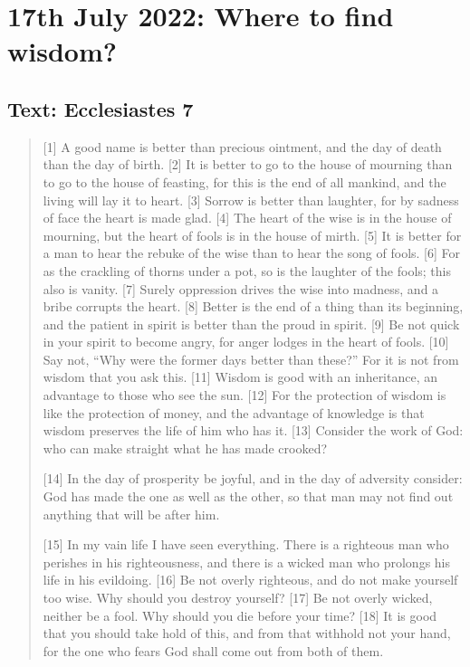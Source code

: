\section{17th July 2022: Where to find wisdom?}
\subsection*{Text: Ecclesiastes 7}
  \begin{quote}
    [1] A good name is better than precious ointment,
        and the day of death than the day of birth.
    [2] It is better to go to the house of mourning
        than to go to the house of feasting,
    for this is the end of all mankind,
        and the living will lay it to heart.
    [3] Sorrow is better than laughter,
        for by sadness of face the heart is made glad.
    [4] The heart of the wise is in the house of mourning,
        but the heart of fools is in the house of mirth.
    [5] It is better for a man to hear the rebuke of the wise
        than to hear the song of fools.
    [6] For as the crackling of thorns under a pot,
        so is the laughter of the fools;
        this also is vanity.
    [7] Surely oppression drives the wise into madness,
        and a bribe corrupts the heart.
    [8] Better is the end of a thing than its beginning,
        and the patient in spirit is better than the proud in spirit.
    [9] Be not quick in your spirit to become angry,
        for anger lodges in the heart of fools.
    [10] Say not, “Why were the former days better than these?”
        For it is not from wisdom that you ask this.
    [11] Wisdom is good with an inheritance,
        an advantage to those who see the sun.
    [12] For the protection of wisdom is like the protection of money,
        and the advantage of knowledge is that wisdom preserves the life of
        him who has it.
    [13] Consider the work of God:
        who can make straight what he has made crooked?


    [14] In the day of prosperity be joyful, and in the day of adversity
    consider: God has made the one as well as the other, so that man may not
    find out anything that will be after him.

    [15] In my vain life I have seen everything.  There is a righteous man
    who perishes in his righteousness, and there is a wicked man who prolongs
    his life in his evildoing.  [16] Be not overly righteous, and do not make
    yourself too wise.  Why should you destroy yourself?  [17] Be not overly
    wicked, neither be a fool.  Why should you die before your time?  [18] It
    is good that you should take hold of this, and from that withhold not
    your hand, for the one who fears God shall come out from both of them.


\end{quote}
